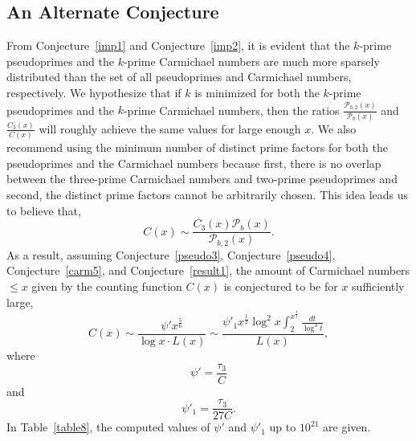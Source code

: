 \documentclass[11pt]{article}
\theoremstyle{plain}
\theoremstyle{definition}
\theoremstyle{remark}
\numberwithin{equation}{subsection}
\begin{document}
\subsection{An Alternate Conjecture}
From Conjecture~\ref{imp1} and Conjecture~\ref{imp2}, it is evident that the $k$-prime pseudoprimes and the $k$-prime Carmichael numbers are much more sparsely distributed than the set of all pseudoprimes and Carmichael numbers, respectively. We hypothesize that if $k$ is minimized for both the $k$-prime pseudoprimes and the $k$-prime Carmichael numbers, then the ratios $\frac{\mathscr{P}_{b,2}(x)}{\mathscr{P}_b(x)}$ and $\frac{C_3(x)}{C(x)}$ will roughly achieve the same values for large enough $x$. We also recommend using the minimum number of distinct prime factors for both the pseudoprimes and the Carmichael numbers because first, there is no overlap between the three-prime Carmichael numbers and two-prime pseudoprimes and second, the distinct prime factors cannot be arbitrarily chosen. This idea leads us to believe that,
\begin{equation*}
C(x) \sim \frac{{C_3(x)}{\mathscr{P}_b(x)}}{\mathscr{P}_{b,2}(x)}.
\end{equation*}
As a result, assuming Conjecture~\ref{pseudo3}, Conjecture~\ref{pseudo4}, Conjecture~\ref{carm5}, and Conjecture~\ref{result1}, the amount of Carmichael numbers $\le x$ given by the counting function $C(x)$ is conjectured to be for $x$ sufficiently large,
\begin{equation} \label{39}
C(x) \sim \frac{\psi'{x^{\frac{5}{6}}}}{\log x \cdot L(x)} \sim \frac{{\psi'_{1}} {x^{\frac{1}{2}}} \log^2 x \displaystyle\int_2^{x^{\frac{1}{3}}}\frac{dt}{\log^3 t}}{L(x)},
\end{equation}
where
\begin{equation} \label{40}
\psi' = \frac{\tau_3}{C}
\end{equation}
and
\begin{equation} \label{41}
\psi'_{1} = \frac{\tau_3}{27C}.
\end{equation}
In Table~\ref{table8}, the computed values of $\psi'$ and $\psi'_1$ up to $10^{21}$ are given.
\end{document}
